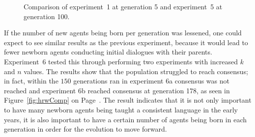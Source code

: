\begin{figure}
    \centering
    \hfill
    \caption[Comparison of the 5th generation in experiment number 1 and the 100th generation in experiment number 5.]{Comparison of  experiment~1 at generation 5 and  experiment~5 at generation 100.}
    \label{fig:SNComparison}
\end{figure}

If the number of new agents being born per generation was lessened, one could expect to see similar results as the previous experiment, because it would lead to fewer newborn agents conducting initial dialogues with their parents. Experiment~6 tested this through performing two experiments with increased $k$ and $n$ values. The results show that the population struggled to reach consensus; in fact, within the $150$ generations ran in experiment 6a consensus was not reached and experiment 6b reached consensus at generation 178, as seen in Figure~\ref{fig:hrwComp} on Page~\pageref{fig:hrwComp}. The result indicates that it is not only important to have many newborn agents being taught a consistent language in the early years, it is also important to have a certain number of agents being born in each generation in order for the evolution to move forward. 

